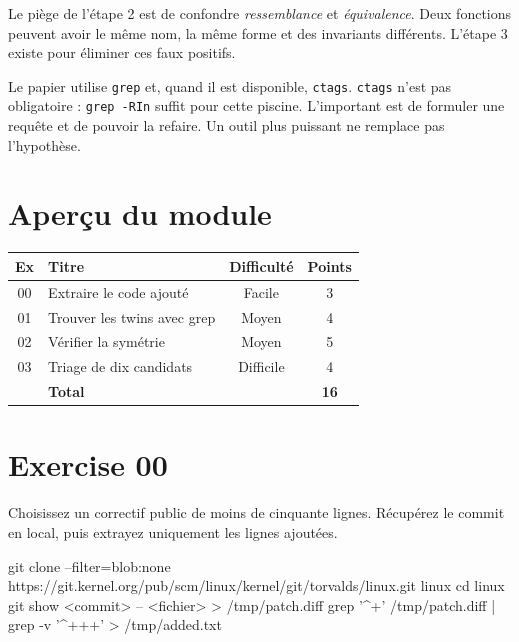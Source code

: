 \documentclass{training}
\begin{document}
Le piège de l'étape 2 est de confondre \emph{ressemblance} et
\emph{équivalence}. Deux fonctions peuvent avoir le même nom, la même forme
et des invariants différents. L'étape 3 existe pour éliminer ces faux
positifs.

\begin{info}
Le papier utilise \texttt{grep} et, quand il est disponible, \texttt{ctags}.
\texttt{ctags} n'est pas obligatoire : \texttt{grep -RIn} suffit pour cette
piscine. L'important est de formuler une requête et de pouvoir la refaire.
Un outil plus puissant ne remplace pas l'hypothèse.
\end{info}

\chapter{Aperçu du module}

\begin{center}
\begin{tabularx}{\linewidth}{|c|l|c|c|}
\hline
\textbf{Ex} & \textbf{Titre} & \textbf{Difficulté} & \textbf{Points} \\ \hline
00 & Extraire le code ajouté & Facile & 3 \\
01 & Trouver les twins avec grep & Moyen & 4 \\
02 & Vérifier la symétrie & Moyen & 5 \\
03 & Triage de dix candidats & Difficile & 4 \\ \hline
& \textbf{Total} & & \textbf{16} \\ \hline
\end{tabularx}
\end{center}

\startexercices

\chapter{Exercise 00}
\makeheaderfiles

Choisissez un correctif public de moins de cinquante lignes. Récupérez le
commit en local, puis extrayez uniquement les lignes ajoutées.

\begin{console}
git clone --filter=blob:none https://git.kernel.org/pub/scm/linux/kernel/git/torvalds/linux.git linux
cd linux
git show <commit> -- <fichier> > /tmp/patch.diff
grep '^+' /tmp/patch.diff | grep -v '^+++' > /tmp/added.txt
\end{console}
\end{document}
